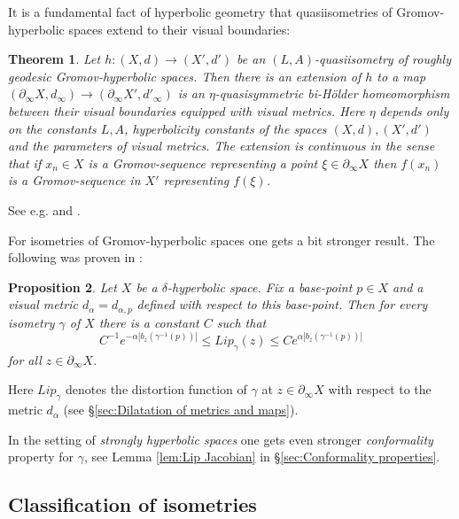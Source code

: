 \documentclass[12pt]{amsbook}%
\newtheorem{thm}{Theorem}[chapter]
\newtheorem{prop}[thm]{Proposition}
\theoremstyle{definition}
\theoremstyle{remark}
\numberwithin{section}{chapter}
\numberwithin{subsection}{section}
\numberwithin{figure}{chapter}
\def\ga{\gamma}
\def\al{\alpha}
\def\geo{\partial_\infty}
\def\kap{}
\begin{document}
{\kap 

It is a fundamental fact of hyperbolic geometry that quasiisometries of Gromov-hyperbolic spaces extend to their visual boundaries:  


\begin{thm}\label{thm:boundary extension}
Let $h: (X,d)\to (X',d')$ be an $(L,A)$-quasiisometry of roughly geodesic Gromov-hyperbolic spaces. Then there is an extension of $h$ to a map $(\geo X, d_\infty)\to (\geo X', d'_\infty)$ is an $\eta$-quasisymmetric bi-H\"older homeomorphism  between their visual boundaries equipped with visual metrics. Here $\eta$ depends only on the constants $L, A$, hyperbolicity constants of the spaces $(X,d), (X',d')$ and the parameters of visual metrics. The extension is continuous in the sense that if $x_n\in X$ is a Gromov-sequence representing a point $\xi\in \geo X$ then $f(x_n)$ is a Gromov-sequence in $X'$ representing $f(\xi)$. 
\end{thm}

See e.g. \cite[Theorem 5.2.17]{Buyalo-Schroeder} and \cite{Vaisala}. 

\medskip



For isometries of Gromov-hyperbolic spaces one gets a bit stronger result.   The following was proven in \cite[Proposition 3.1]{Coo93}:



\begin{prop}
Let $X$ be a $\delta$-hyperbolic space. Fix a base-point $p\in X$ and a visual metric $d_\al=d_{\al,p}$ 
defined with respect to this base-point. Then for every isometry $\ga$ of $X$ there is a constant $C$ such that 
$$
C^{-1} e^{-\al |b_z(\ga^{-1}(p))|} \le Lip_\ga(z)\le C e^{\al |b_z(\ga^{-1}(p))|}$$
for all $z\in \geo X$. 
\end{prop}

Here $Lip_\ga$ denotes the distortion function of $\ga$ at $z\in \geo X$ with respect to the metric $d_\al$ (see \S \ref{sec:Dilatation of metrics and maps}).


In the setting of {\em strongly hyperbolic spaces} one gets even stronger {\em conformality} property for $\ga$, 
see Lemma \ref{lem:Lip Jacobian} in \S \ref{sec:Conformality properties}. 


}



\subsection{Classification of isometries}
\end{document}
